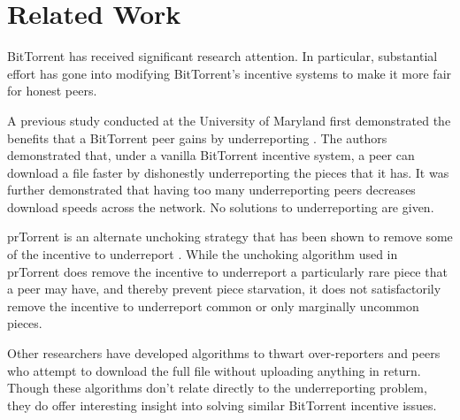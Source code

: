 \section{Related Work}


BitTorrent has received significant research attention. In particular, substantial effort has gone into modifying BitTorrent's incentive systems to make it more fair for honest peers.

A previous study conducted at the University of Maryland first demonstrated the benefits that a BitTorrent peer gains by underreporting \cite{dlbittorrent}. The authors demonstrated that, under a vanilla BitTorrent incentive system, a peer can download a file faster by dishonestly underreporting the pieces that it has. It was further demonstrated that having too many underreporting peers decreases download speeds across the network. No solutions to underreporting are given.

prTorrent is an alternate unchoking strategy that has been shown to remove some of the incentive to underreport \cite{prtorrent}. While the unchoking algorithm used in prTorrent does remove the incentive to underreport a particularly rare piece that a peer may have, and thereby prevent piece starvation, it does not satisfactorily remove the incentive to underreport common or only marginally uncommon pieces.

Other researchers \cite{free-riding} have developed algorithms to thwart over-reporters and peers who attempt to download the full file without uploading anything in return. Though these algorithms don't relate directly to the underreporting problem, they do offer interesting insight into solving similar BitTorrent incentive issues.


